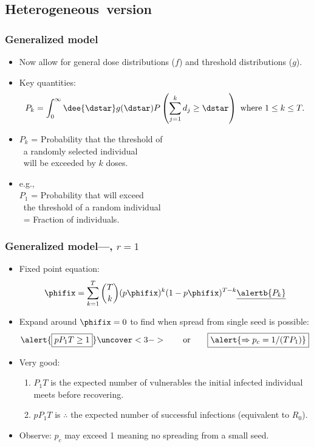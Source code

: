 \subsection{Heterogeneous\ version}

\begin{frame}
  \frametitle{Generalized model}

  \begin{itemize}
  \item<1-> 
    Now allow for general dose distributions ($f$)
    and threshold distributions ($g$).
  \item<2->
    Key quantities:
    $$
    P_k
    =
    \int_{0}^{\infty} \dee{\dstar}
    g(\dstar)
    P\left(
      \sum_{j=1}^{k} d_j \ge \dstar
    \right)
    \  \mbox{where} \  1 \le k \le T.
    $$
  \item<3->
    $P_k$ = Probability that the threshold of \\
    \quad \quad \  a randomly selected individual\\
    \quad \quad \  will be exceeded by $k$ doses.
  \item<4->
    e.g., \\
    $P_1$ = Probability that \underline{} will exceed\\
    \quad \quad \ the threshold of a random individual\\
    \ \quad  = Fraction of \underline{} individuals.
  \end{itemize}

\end{frame}

\begin{frame}
  \frametitle{Generalized model---, $r=1$}

  \begin{itemize}
  \item
    Fixed point equation:
    $$
    \phifix
    =
    \sum_{k=1}^{T}
    \binom{T}{k}
    (p\phifix)^{k}
    (1-p\phifix)^{T-k}
    \underline{\alertb{P_k}}
    $$
  \item<2-> 
    Expand around $\phifix=0$ to find
    when spread from single seed is possible:
    $$\alert{\boxed{p P_1 T \ge 1}}
    \uncover<3->{\qquad \mbox{or} \qquad
      \boxed{\alert{\Rightarrow p_c = 1/(TP_1)}}
    }
    $$
  \item<4->
    Very good:
    \begin{enumerate}
    \item<4-> 
      $P_1T$ is the expected number of vulnerables the
      initial infected individual meets before recovering.
    \item<5-> 
      $pP_1T$ is $\therefore$ the expected number of
      successful infections (equivalent to $R_0$).
    \end{enumerate}
  \item<6->
    Observe: $p_c$ may exceed 1 meaning no spreading from
    a small seed.
  \end{itemize}

\end{frame}

